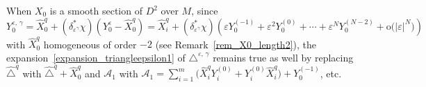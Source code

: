 \documentclass[AHL,Unicode,published]{cedram}
\newcommand{\calA}{\mathcal{A}}
\newcommand{\rmo}{\mathrm{o}}
\begin{document}

When $X_0$ is a smooth section of $D^2$ over $M$, since $Y_0^{\varepsilon,\,\gamma} = \widehat{X}_0^{q} + (\delta _{\varepsilon^\gamma}^*\chi) (Y_0^\varepsilon-\widehat{X}_0^{q}) = \widehat{X}_i^{q} + (\delta _{\varepsilon^\gamma}^*\chi) (\varepsilon Y_0^{(-1)} + \varepsilon^2 Y_0^{(0)} + \cdots + \varepsilon^N Y_0^{(N-2)} + \rmo\big(\vert\varepsilon\vert^N\big))$ with $\widehat{X}_0^{q}$ homogeneous of order $-2$ (see Remark~\ref{rem_X0_length2}), the expansion~\eqref{expansion_triangleepsilon1} of $\triangle^{\varepsilon,\,\gamma}$ remains true as well by replacing $\widehat{\triangle}^{q}$ with $\widehat{\triangle}^{q} +\widehat{X}_0^{q}$ and $\calA_1$ with $\calA_1 = \sum_{i=1}^m \big(\widehat{X}^{q}_i Y^{(0)}_i + Y^{(0)}_i \widehat{X}^{q}_i \big) + Y^{(-1)}_0$, etc.

\end{document}
